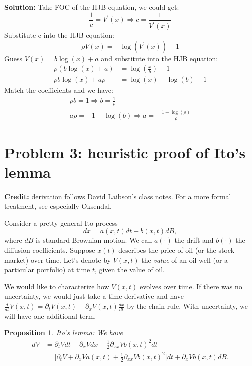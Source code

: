 \documentclass[11pt]{extarticle}
\theoremstyle{plain}
\newtheorem{prop}[thm]{Proposition}
\theoremstyle{definition}
\begin{document}
\begin{enumerate}
\textbf{Solution:} Take FOC of the HJB equation, we could get:
$$
\frac{1}{c}=V^{\prime}(x) \Rightarrow c=\frac{1}{V^{\prime}(x)}
$$
Substitute c into the HJB equation:
$$
\rho V(x)=-\log \left(V^{\prime}(x)\right)-1
$$
Guess $V(x)=b \log (x)+a$ and substitute into the HJB equation:
$$
\begin{aligned}
\rho(b \log (x)+a) &=\log \left(\frac{x}{b}\right)-1 \\
\rho b \log (x)+a \rho &=\log (x)-\log (b)-1
\end{aligned}
$$
Match the coefficients and we have:
$$
\begin{array}{r}
\rho b=1 \Rightarrow b=\frac{1}{\rho} \\
a \rho=-1-\log (b) \Rightarrow a=-\frac{1-\log (\rho)}{\rho}
\end{array}
$$

\end{enumerate}




\vspace{10mm}
\section*{Problem 3: heuristic proof of Ito's lemma}

\textbf{Credit:} derivation follows David Laibson's class notes. For a more formal treatment, see especially Oksendal. 

\vspace{5mm}
\noindent
Consider a pretty general Ito process
\begin{equation*}
	dx = a(x, t) dt + b(x, t) dB,
\end{equation*}
where $dB$ is standard Brownian motion. We call $a(\cdot)$ the drift and $b(\cdot)$ the diffusion coefficients. Suppose $x(t)$ describes the price of oil (or the stock market) over time. Let's denote by $V(x, t)$ the \textit{value} of an oil well (or a particular portfolio) at time $t$, given the value of oil. 

We would like to characterize how $V(x, t)$ evolves over time. If there was no uncertainty, we would just take a time derivative and have $\frac{d}{dt} V(x, t) = \partial_t V(x, t) + \partial_x V(x, t) \frac{dx}{dt}$ by the chain rule. With uncertainty, we will have one additional term. 

\begin{prop}
	Ito's lemma: We have 
	\begin{align*}
		dV &= \partial_t V dt + \partial_x V dx + \frac{1}{2} \partial_{xx} V b(x, t)^2 dt \\
		&= \bigg[ \partial_t V + \partial_x V a(x, t) + \frac{1}{2} \partial_{xx} V b(x, t)^2\bigg] dt + \partial_x V b(x, t) dB.
	\end{align*}
\end{prop}
\end{document}
